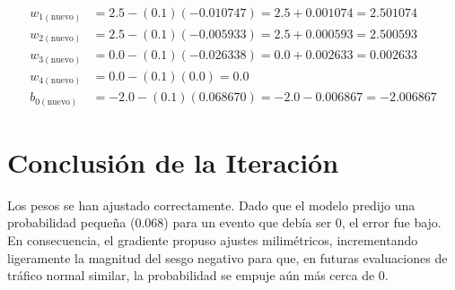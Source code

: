 \documentclass{article}
\begin{document}
\begin{align*}
    w_{1(\text{nuevo})} &= 2.5 - (0.1)(-0.010747) = 2.5 + 0.001074 = 2.501074 \\
    w_{2(\text{nuevo})} &= 2.5 - (0.1)(-0.005933) = 2.5 + 0.000593 = 2.500593 \\
    w_{3(\text{nuevo})} &= 0.0 - (0.1)(-0.026338) = 0.0 + 0.002633 = 0.002633 \\
    w_{4(\text{nuevo})} &= 0.0 - (0.1)(0.0) = 0.0 \\
    b_{0(\text{nuevo})} &= -2.0 - (0.1)(0.068670) = -2.0 - 0.006867 = -2.006867
\end{align*}

\section*{Conclusión de la Iteración}
Los pesos se han ajustado correctamente. Dado que el modelo predijo una probabilidad pequeña (0.068) para un evento que debía ser 0, el error fue bajo. En consecuencia, el gradiente propuso ajustes milimétricos, incrementando ligeramente la magnitud del sesgo negativo para que, en futuras evaluaciones de tráfico normal similar, la probabilidad se empuje aún más cerca de 0.
\end{document}
